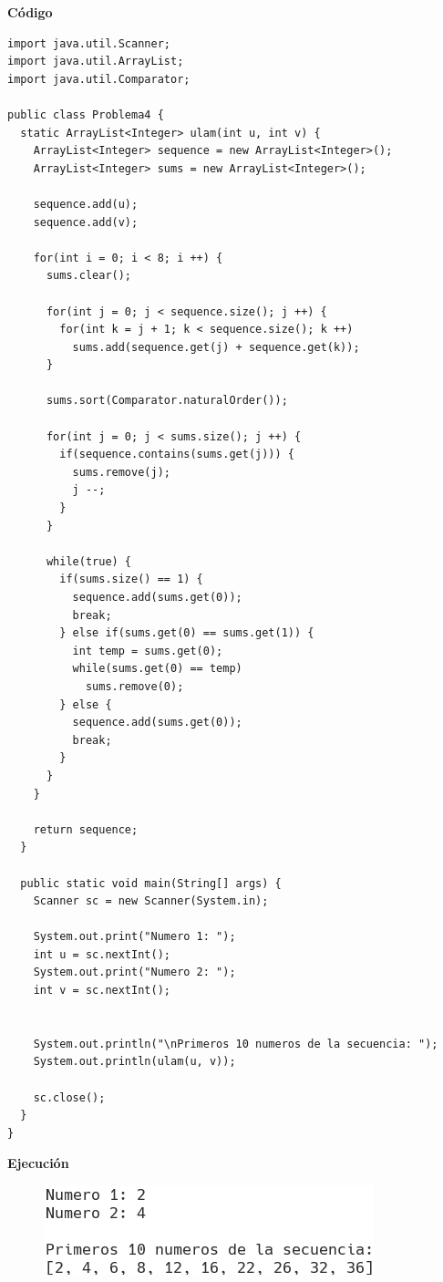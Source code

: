\documentclass[11pt, twocolumn]{article}
\begin{document}
  \textbf{Código}
  \begin{lstlisting}
import java.util.Scanner;
import java.util.ArrayList;
import java.util.Comparator;

public class Problema4 {
  static ArrayList<Integer> ulam(int u, int v) {
    ArrayList<Integer> sequence = new ArrayList<Integer>();
    ArrayList<Integer> sums = new ArrayList<Integer>();

    sequence.add(u);
    sequence.add(v);

    for(int i = 0; i < 8; i ++) {
      sums.clear();

      for(int j = 0; j < sequence.size(); j ++) {
        for(int k = j + 1; k < sequence.size(); k ++)
          sums.add(sequence.get(j) + sequence.get(k));
      }

      sums.sort(Comparator.naturalOrder());

      for(int j = 0; j < sums.size(); j ++) {
        if(sequence.contains(sums.get(j))) {
          sums.remove(j);
          j --;
        }
      }

      while(true) {
        if(sums.size() == 1) {
          sequence.add(sums.get(0));
          break;
        } else if(sums.get(0) == sums.get(1)) {
          int temp = sums.get(0);
          while(sums.get(0) == temp)
            sums.remove(0);
        } else {
          sequence.add(sums.get(0));
          break;
        }
      }
    }

    return sequence;
  }

  public static void main(String[] args) {
    Scanner sc = new Scanner(System.in);

    System.out.print("Numero 1: ");
    int u = sc.nextInt();
    System.out.print("Numero 2: ");
    int v = sc.nextInt();


    System.out.println("\nPrimeros 10 numeros de la secuencia: ");
    System.out.println(ulam(u, v));

    sc.close();
  }
}    
  \end{lstlisting}

  \textbf{Ejecución}
  \begin{figure}[ht]
    \includegraphics[width=0.6\columnwidth, center]{P4.png}
  \end{figure}
\end{document}

